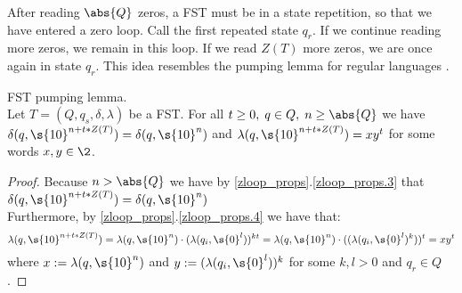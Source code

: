 After reading $\abs{Q}$ zeros, a FST must be in a state repetition, so that we have entered a zero loop. Call the first repeated state $q_r$. If we continue reading more zeros, we remain in this loop. If we read $Z(T)$ more zeros, we are once again in state $q_r$. This idea resembles the pumping lemma for regular languages \cite{10.1145/990524.990528}.

\begin{lemma}{FST pumping lemma.}\label{fst_pumping_lemma}\\
	Let $T=(Q,q_s,\delta,\lambda)$ be a FST.
	For all $t\geq 0,\;q\in Q,\;n\geq \abs{Q}$ we have $\delta(q,\s{10}^{n+t*Z(T)})=\delta(q,\s{10}^{n})$ and $\lambda(q,\s{10}^{n+t*Z(T)})=xy^t$ for some words $x,y\in\2$.
	\begin{proof}
		Because $n>\abs{Q}$ we have by \cref{zloop_props}.\ref{zloop_props.3} that 
		$\delta(q,\s{10}^{n+t*Z(T)})=\delta(q,\s{10}^{n})$\\
		Furthermore, by \cref{zloop_props}.\ref{zloop_props.4} we have that:
		$$\lambda(q,\s{10}^{n+t*Z(T)})=\lambda(q,\s{10}^{n})\cdot(\lambda(q_i,\s{0}^{l}))^{kt}=\lambda(q,\s{10}^{n})\cdot((\lambda(q_i,\s{0}^{l})^k))^{t}=xy^t$$
		where $x := \lambda(q,\s{10}^{n})$ and $y := (\lambda(q_i,\s{0}^{l}))^k$ for some $k,l>0$ and $q_r\in Q$.
	\end{proof}
\end{lemma}